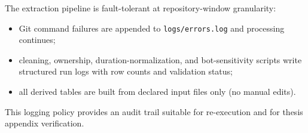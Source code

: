 The extraction pipeline is fault-tolerant at repository-window granularity:
\begin{itemize}[leftmargin=*]
  \item Git command failures are appended to \texttt{logs/errors.log} and processing continues;
  \item cleaning, ownership, duration-normalization, and bot-sensitivity scripts write structured run logs with row counts and validation status;
  \item all derived tables are built from declared input files only (no manual edits).
\end{itemize}

This logging policy provides an audit trail suitable for re-execution and for thesis appendix verification.





